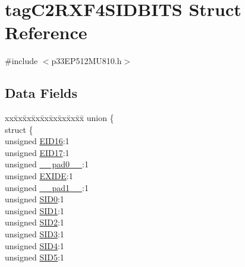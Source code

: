 \hypertarget{structtag_c2_r_x_f4_s_i_d_b_i_t_s}{}\section{tag\+C2\+R\+X\+F4\+S\+I\+D\+B\+I\+TS Struct Reference}
\label{structtag_c2_r_x_f4_s_i_d_b_i_t_s}


{\ttfamily \#include $<$p33\+E\+P512\+M\+U810.\+h$>$}

\subsection*{Data Fields}
\begin{DoxyCompactItemize}
\item 
\begin{tabbing}
xx\=xx\=xx\=xx\=xx\=xx\=xx\=xx\=xx\=\kill
union \{\\
\>struct \{\\
\>\>unsigned \hyperlink{structtag_c2_r_x_f4_s_i_d_b_i_t_s_a6dd5663b0c9838c56db040560ca0efa1}{EID16}:1\\
\>\>unsigned \hyperlink{structtag_c2_r_x_f4_s_i_d_b_i_t_s_aa648615464b0eb29967529333eee9fd9}{EID17}:1\\
\>\>unsigned \hyperlink{structtag_c2_r_x_f4_s_i_d_b_i_t_s_adf71f3d8410c1f1dbbc96680a92c49af}{\_\_pad0\_\_}:1\\
\>\>unsigned \hyperlink{structtag_c2_r_x_f4_s_i_d_b_i_t_s_a09ff1c1be3927220bd3dfbc10edfe243}{EXIDE}:1\\
\>\>unsigned \hyperlink{structtag_c2_r_x_f4_s_i_d_b_i_t_s_acaf2d0924a107ec6e8d2e31febaf66f9}{\_\_pad1\_\_}:1\\
\>\>unsigned \hyperlink{structtag_c2_r_x_f4_s_i_d_b_i_t_s_a1ca276ac15df60e1f7b9a6d0011ade93}{SID0}:1\\
\>\>unsigned \hyperlink{structtag_c2_r_x_f4_s_i_d_b_i_t_s_a3405d354f81391f879648f69f504dfc8}{SID1}:1\\
\>\>unsigned \hyperlink{structtag_c2_r_x_f4_s_i_d_b_i_t_s_ad744966dfc49307f731b7045b01b94e5}{SID2}:1\\
\>\>unsigned \hyperlink{structtag_c2_r_x_f4_s_i_d_b_i_t_s_a9345f3e64720be93e83d8dfc827f3f45}{SID3}:1\\
\>\>unsigned \hyperlink{structtag_c2_r_x_f4_s_i_d_b_i_t_s_aefb106fed4bb40e2c3c71ac612c554e3}{SID4}:1\\
\>\>unsigned \hyperlink{structtag_c2_r_x_f4_s_i_d_b_i_t_s_a0f221b3c9612231686bf87ccdcec8489}{SID5}:1\\

\end{tabbing}
\end{DoxyCompactItemize}
